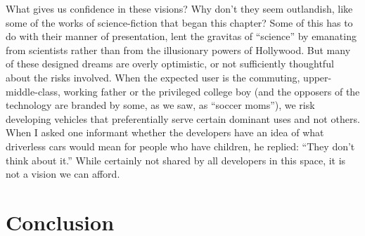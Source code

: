 What gives us confidence in these visions? Why don't they seem
outlandish, like some of the works of science-fiction that began this
chapter? Some of this has to do with their manner of 
presentation, lent the gravitas of ``science'' by emanating from
scientists rather than from the
illusionary powers of Hollywood. But many of these designed dreams are
overly optimistic, or not sufficiently thoughtful about the risks
involved. When the
expected user is the commuting, upper-middle-class, working father or
the privileged college boy (and the opposers of the technology are
branded by some, as we saw, as ``soccer moms''), we risk developing
vehicles that preferentially serve certain dominant uses and not
others. When I asked one informant whether the developers have an idea
of what driverless cars would mean for people who have children, he
replied:  ``They don't think about it.'' While certainly not shared by
all developers in this space, it is not a vision we can afford.

\section{Conclusion}



